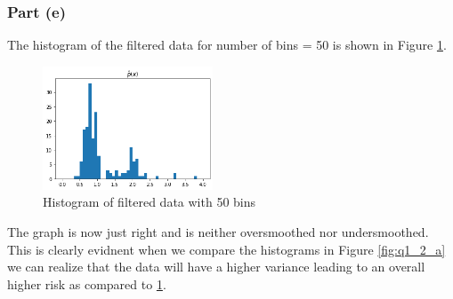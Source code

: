 \subsubsection{Part (e)}

The histogram of the filtered data for number of bins = 50 is shown in Figure \ref{fig:q1_2_e}.

\begin{figure}[H]
    \centering
    \includegraphics[width=0.45\textwidth]{../q1/images/optimalhistogram.png}
    \caption{Histogram of filtered data with 50 bins}
    \label{fig:q1_2_e}
\end{figure}

\hspace{-16pt}The graph is now just right and is neither oversmoothed nor undersmoothed. This is clearly evidnent when we compare the histograms in Figure \ref{fig:q1_2_a} we can realize that the data will have a higher variance leading to an overall higher risk as compared to \ref{fig:q1_2_e}.
\newpage